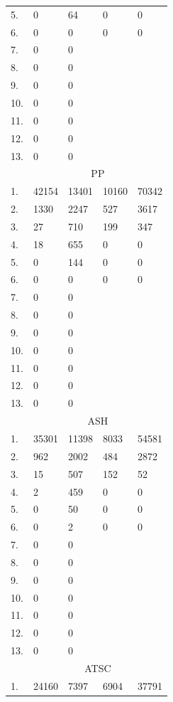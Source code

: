 \documentclass{article}
\begin{document}
\begin{longtable}{l|l|l||l|l}
    5. & 0 & 64 & 0 & 0\\
    6. & 0 & 0 & 0 & 0\\
    7. & 0 & 0 & & \\
    8. & 0 & 0 & & \\
    9. & 0 & 0 & & \\
    10. & 0 & 0 & & \\
    11. & 0 & 0 & & \\
    12. & 0 & 0 & & \\
    13. & 0 & 0 & & \\
    \hline
    & \multicolumn{4}{c}{PP} \\
    \hline
    1. & 42154 & 13401 & 10160 & 70342\\
    2. & 1330 & 2247 & 527 & 3617\\
    3. & 27 & 710 & 199 & 347\\
    4. & 18 & 655 & 0 & 0\\
    5. & 0 & 144 & 0 & 0\\
    6. & 0 & 0 & 0 & 0\\
    7. & 0 & 0 & & \\
    8. & 0 & 0 & & \\
    9. & 0 & 0 & & \\
    10. & 0 & 0 & & \\
    11. & 0 & 0 & & \\
    12. & 0 & 0 & & \\
    13. & 0 & 0 & & \\
    \hline
    & \multicolumn{4}{c}{ASH} \\
    \hline
    1. & 35301 & 11398 & 8033 & 54581 \\
    2. & 962 & 2002 & 484 & 2872 \\
    3. & 15 & 507 & 152 & 52 \\
    4. & 2 & 459 & 0 & 0 \\
    5. & 0 & 50 & 0 & 0\\
    6. & 0 & 2 & 0 & 0\\
    7. & 0 & 0 & & \\
    8. & 0 & 0 & & \\
    9. & 0 & 0 & & \\
    10. & 0 & 0 & & \\
    11. & 0 & 0 & & \\
    12. & 0 & 0 & & \\
    13. & 0 & 0 & & \\
    \hline
    & \multicolumn{4}{c}{ATSC} \\
    \hline
    1. & 24160 & 7397 & 6904 & 37791\\

\end{longtable}
\end{document}
